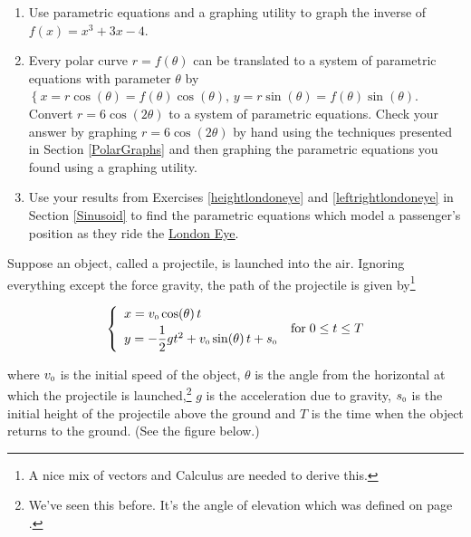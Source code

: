 \documentclass{ximera}
\begin{document}
\begin{enumerate}

\setcounter{enumi}{\value{HW}}

\item Use parametric equations and a graphing utility to graph the inverse of $f(x) = x^{3} + 3x - 4$.

\item  Every polar curve $r = f(\theta)$ can be translated to a system of parametric equations with parameter $\theta$ by $\left\{ x = r\cos(\theta) = f(\theta) \cos(\theta), \, y = r \sin(\theta) = f(\theta) \sin(\theta) \right.$.  Convert $r = 6\cos(2\theta)$ to a system of parametric equations. Check your answer by graphing $r = 6\cos(2\theta)$ by hand using the techniques presented in Section \ref{PolarGraphs} and then graphing the parametric equations you found using a graphing utility.


\item  Use your results from Exercises \ref{heightlondoneye} and \ref{leftrightlondoneye} in Section \ref{Sinusoid} to find the parametric equations which model a passenger's position as they ride the \href{http://en.wikipedia.org/wiki/London_Eye}{\underline{London Eye}}. 




\setcounter{HW}{\value{enumi}}
\end{enumerate}

\label{projectoilemotion}

Suppose an object, called a projectile, is launched into the air.  Ignoring everything except the force gravity, the path of the projectile is given by\footnote{A nice mix of vectors and Calculus are needed to derive this.}

\[ \left\{ \begin{array}{l} x =   v_{\text{\tiny $0$}} \cos(\theta) \, t \\ [3pt]
															y = -\dfrac{1}{2} g t^2 +  v_{\text{\tiny $0$}} \sin(\theta) \, t + s_{\text{\tiny $0$}} \\ \end{array} \right. \; \text{for} \; 0 \leq t \leq T \]

where  $v_{\text{\tiny $0$}}$ is the initial speed of the object, $\theta$ is the angle from the horizontal at which the projectile is launched,\footnote{We've seen this before.  It's the angle of elevation which was defined on page \pageref{angleofelevation}.} $g$ is the acceleration due to gravity,  $s_{\text{\tiny $0$}}$ is the initial height of the projectile above the ground and $T$ is the time when the object returns to the ground.  (See the figure below.)
\end{document}
